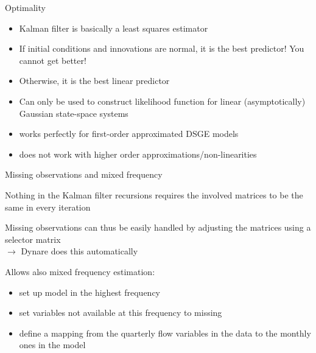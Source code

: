 \documentclass[handout,usepdftitle=false,xcolor=dvipsnames,aspectratio=169]{beamer}
\begin{document}
\begin{frame}{Optimality}
  \begin{itemize}
    \item Kalman filter is basically a least squares estimator\vspace{0.2cm}
    \item If initial conditions and innovations are normal, it is the best predictor! You cannot get better!\vspace{0.2cm}
    \item Otherwise, it is the best linear predictor\vspace{0.2cm}
    \item Can only be used to construct likelihood function for linear (asymptotically) Gaussian state-space systems \vspace{0.2cm}
    \item[$\rightarrow$] works perfectly for first-order approximated DSGE models
    \item[$\rightarrow$] does not work with higher order approximations/non-linearities
  \end{itemize}
\end{frame}




\begin{frame}{Missing observations and mixed frequency}
  \begin{witemize}
    \item Nothing in the Kalman filter recursions requires the involved matrices to be the same in every iteration
    \item Missing observations can thus be easily handled by adjusting the matrices using a selector matrix\\
    $\rightarrow$ Dynare does this automatically
    \item Allows also mixed frequency estimation:
    \begin{itemize}
      \item set up model in the highest frequency
      \item set variables not available at this frequency to missing
      \item define a mapping from the quarterly flow variables in the data to the monthly ones in the model
    \end{itemize}
  \end{witemize}
\end{frame}
\end{document}
